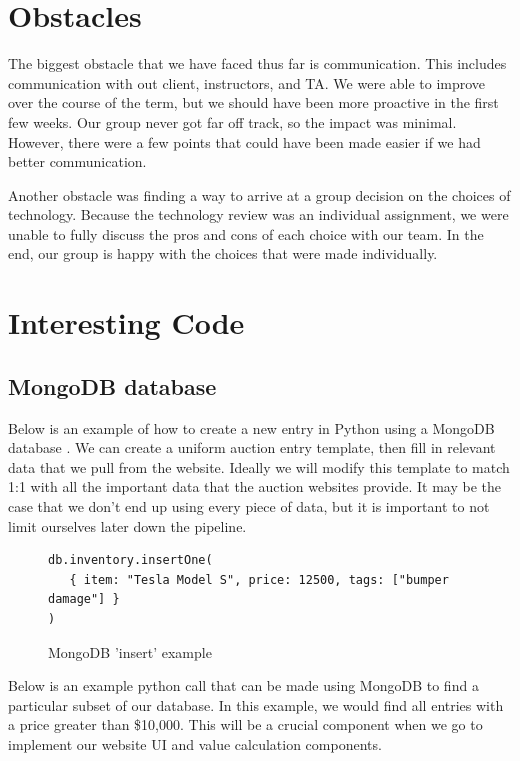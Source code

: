 \documentclass[onecolumn, draftclsnofoot,10pt, compsoc]{IEEEtran}
\begin{document}
\section{Obstacles}
The biggest obstacle that we have faced thus far is communication. This includes communication with out client, instructors, and TA. We were able to improve over the course of the term, but we should have been more proactive in the first few weeks. Our group never got far off track, so the impact was minimal. However, there were a few points that could have been made easier if we had better communication. 

Another obstacle was finding a way to arrive at a group decision on the choices of technology. Because the technology review was an individual assignment, we were unable to fully discuss the pros and cons of each choice with our team. In the end, our group is happy with the choices that were made individually. 

\section{Interesting Code}  %
\subsection{MongoDB database}
Below is an example of how to create a new entry in Python using a MongoDB database \cite{mongoDB}. We can create a uniform auction entry template, then fill in relevant data that we pull from the website. Ideally we will modify this template to match 1:1 with all the important data that the auction websites provide. It may be the case that we don't end up using every piece of data, but it is important to not limit ourselves later down the pipeline. 
\begin{figure}[ht]

\begin{verbatim}
db.inventory.insertOne(
   { item: "Tesla Model S", price: 12500, tags: ["bumper damage"] }
)
\end{verbatim}

\caption{MongoDB 'insert' example}
\end{figure}

Below is an example python call that can be made using MongoDB to find a particular subset of our database. In this example, we would find all entries with a price greater than \$10,000. This will be a crucial component when we go to implement our website UI and value calculation components.
\end{document}
